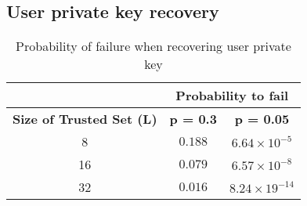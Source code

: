   \subsection{User private key recovery}
  \label{sec:eval_private_key_recovery}
  \begin{table}
    \centering
    \footnotesize
    \begin{tabular}{|c|c|c|}
      \cline{2-3}
      \multicolumn{1}{c|}{}&  \multicolumn{2}{c|}{\textbf{Probability to fail}} \\ \cline{2-3}
      \hline
      \textbf{Size of Trusted Set (L)} & \textbf{p = 0.3} & \textbf{p = 0.05} \\
      \hline \hline
      8 &  $0.188$ & $6.64 \times 10^{-5}$ \\
      \hline
      16 & $0.079$ & $6.57 \times 10^{-8}$  \\
      \hline
      32 & $0.016$ & $8.24 \times 19^{-14}$  \\
      \hline
    \end{tabular}
    \caption{Probability of failure when recovering user private key}
    \label{tab:p_private_key_recovery}
  \end{table}

